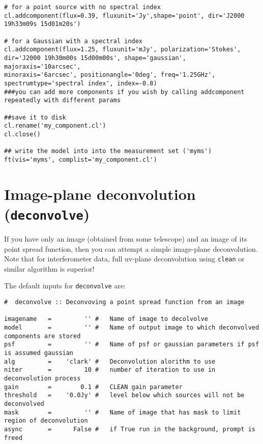 \small
\begin{verbatim}
# for a point source with no spectral index
cl.addcomponent(flux=0.39, fluxunit='Jy',shape='point', dir='J2000 19h33m09s 15d01m20s')
 
# for a Gaussian with a spectral index
cl.addcomponent(flux=1.25, fluxunit='mJy', polarization='Stokes',
dir='J2000 19h30m00s 15d00m00s', shape='gaussian', majoraxis='10arcsec',
minoraxis='6arcsec', positionangle='0deg', freq='1.25GHz',
spectrumtype='spectral index', index=-0.8)
###you can add more components if you wish by calling addcomponent repeatedly with different params
 
##save it to disk
cl.rename('my_component.cl')
cl.close()
 
## write the model into into the measurement set ('myms')
ft(vis='myms', complist='my_component.cl')
\end{verbatim}


\section{Image-plane deconvolution ({\tt deconvolve})}
\label{section:im.deconvolve}

If you have only an image (obtained from some telescope) and an image
of its point spread function, then you can attempt a simple image-plane
deconvolution.  Note that for interferometer data, full uv-plane 
deconvolution using {\tt clean} or similar algorithm is superior!

The default inputs for {\tt deconvolve} are:
\small
\begin{verbatim}
#  deconvolve :: Deconvoving a point spread function from an image

imagename   =         '' #   Name of image to decolvolve
model       =         '' #   Name of output image to which deconvolved components are stored
psf         =         '' #   Name of psf or gaussian parameters if psf is assumed gaussian
alg         =    'clark' #   Deconvolution alorithm to use
niter       =         10 #   number of iteration to use in deconvolution process
gain        =        0.1 #   CLEAN gain parameter 
threshold   =    '0.0Jy' #   level below which sources will not be deconvolved
mask        =         '' #   Name of image that has mask to limit region of deconvolution
async       =      False #   if True run in the background, prompt is freed

\end{verbatim}
\normalsize

